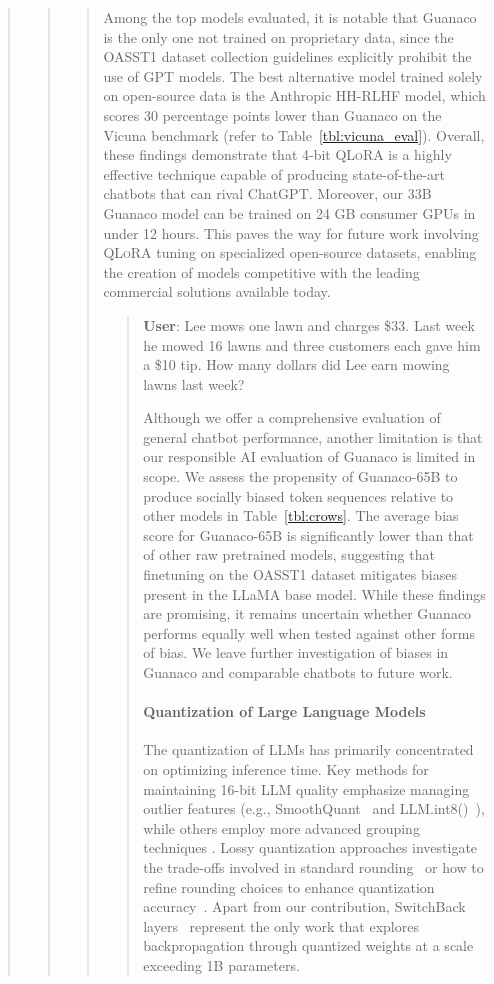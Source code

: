 \begin{quote}
\begin{quote}
\begin{quote}
Among the top models evaluated, it is notable that {Guanaco} is the only one not trained on proprietary data, since the OASST1 dataset collection guidelines explicitly prohibit the use of GPT models. The best alternative model trained solely on open-source data is the Anthropic HH-RLHF model, which scores 30 percentage points lower than {Guanaco} on the Vicuna benchmark (refer to Table~\ref{tbl:vicuna_eval}). Overall, these findings demonstrate that 4-bit \textsc{QLoRA} is a highly effective technique capable of producing state-of-the-art chatbots that can rival ChatGPT. Moreover, our 33B {Guanaco} model can be trained on 24 GB consumer GPUs in under 12 hours. This paves the way for future work involving \textsc{QLoRA} tuning on specialized open-source datasets, enabling the creation of models competitive with the leading commercial solutions available today.

\begin{quote}
    \textbf{User}: Lee mows one lawn and charges \$33. Last week he mowed 16 lawns and three customers each gave him a \$10 tip. How many dollars did Lee earn mowing lawns last week?

Although we offer a comprehensive evaluation of general chatbot performance, another limitation is that our responsible AI evaluation of {Guanaco} is limited in scope. We assess the propensity of {Guanaco}-65B to produce socially biased token sequences relative to other models in Table~\ref{tbl:crows}. The average bias score for {Guanaco}-65B is significantly lower than that of other raw pretrained models, suggesting that finetuning on the OASST1 dataset mitigates biases present in the LLaMA base model. While these findings are promising, it remains uncertain whether {Guanaco} performs equally well when tested against other forms of bias. We leave further investigation of biases in {Guanaco} and comparable chatbots to future work.

\paragraph{Quantization of Large Language Models} The quantization of LLMs has primarily concentrated on optimizing inference time. Key methods for maintaining 16-bit LLM quality emphasize managing outlier features (e.g., SmoothQuant~\citep{xiao2022smoothquant} and LLM.int8()~\citep{dettmers2022llm}), while others employ more advanced grouping techniques \citep{park2022nuqmm, yao2022zeroquant}. Lossy quantization approaches investigate the trade-offs involved in standard rounding~\citep{dettmers2022case,zeng2022glm,pope2022efficiently} or how to refine rounding choices to enhance quantization accuracy~\citep{frantar2022gptq}. Apart from our contribution, SwitchBack layers~\citep{wortsman2023stable} represent the only work that explores backpropagation through quantized weights at a scale exceeding 1B parameters.


\end{quote}
\end{quote}
\end{quote}
\end{quote}
